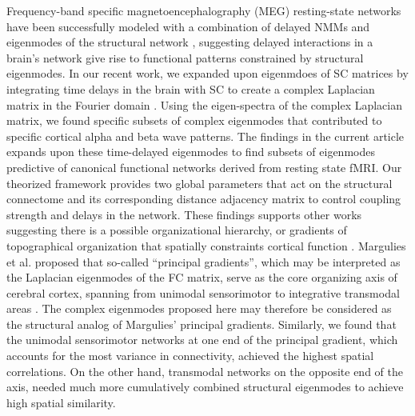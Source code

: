 \documentclass{article}
\begin{document}
Frequency-band specific magnetoencephalography (MEG) resting-state networks have been successfully modeled with a combination of delayed NMMs and eigenmodes of the structural network \cite{tewarie_how_2019}, suggesting delayed interactions in a brain's network give rise to functional patterns constrained by structural eigenmodes. In our recent work, we expanded upon eigenmdoes of SC matrices by integrating time delays in the brain with SC to create a complex Laplacian matrix in the Fourier domain \cite{Raj2020}. Using the eigen-spectra of the complex Laplacian matrix, we found specific subsets of complex eigenmodes that contributed to specific cortical alpha and beta wave patterns. The findings in the current article expands upon these time-delayed eigenmodes to find subsets of eigenmodes predictive of canonical functional networks derived from resting state fMRI. Our theorized framework provides two global parameters that act on the structural connectome and its corresponding distance adjacency matrix to control coupling strength and delays in the network. These findings supports other works suggesting there is a possible organizational hierarchy, or gradients of topographical organization that spatially constraints cortical function \cite{margulies_situating_2016, sepulcre_stepwise_2012, vazquez-rodriguez_gradients_2019, huntenburg_large-scale_2018, buckner_macroscale_2019}. Margulies et al. proposed that so-called ``principal gradients'', which may be interpreted as the Laplacian eigenmodes of the FC matrix, serve as the core organizing axis of cerebral cortex, spanning from unimodal sensorimotor to integrative transmodal areas \cite{margulies_situating_2016}. The complex eigenmodes proposed here may therefore be considered as the structural analog of Margulies' principal gradients.
Similarly, we found that the unimodal sensorimotor networks at one end of the principal gradient, which accounts for the most variance in connectivity, achieved the highest spatial correlations. On the other hand, transmodal networks on the opposite end of the axis, needed much more cumulatively combined structural eigenmodes to achieve high spatial similarity. 
\end{document}
